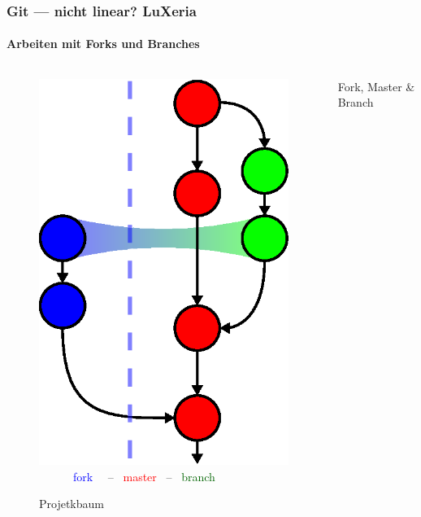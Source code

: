 \begin{frame}
    \frametitle{Git --- nicht linear?\hfill{} LuXeria}
    \framesubtitle{Arbeiten mit Forks und Branches}
    \begin{columns}
        \begin{column}{5cm}
            \begin{figure}
                \includegraphics[scale=0.5]{git_tree.eps}\\
                \textcolor{blue}{~~~~~~fork~~} -- \textcolor{red}{~master~} -- \textcolor{darkgreen}{~branch}
                \caption{Projetkbaum}
            \end{figure}
        \end{column}
        \begin{column}{5cm}
            \begin{block}{Fork, Master \& Branch}

\end{block}
\end{column}
\end{columns}
\end{frame}
